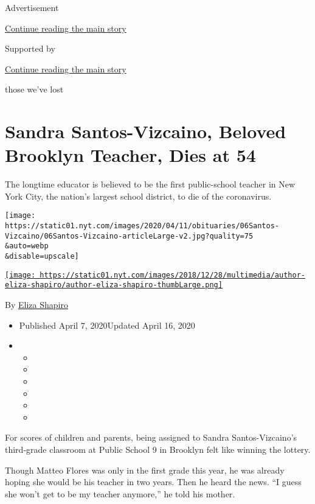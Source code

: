 Advertisement

\protect\hyperlink{after-top}{Continue reading the main story}

Supported by

\protect\hyperlink{after-sponsor}{Continue reading the main story}

those we've lost

\hypertarget{sandra-santos-vizcaino-beloved-brooklyn-teacher-dies-at-54}{%
\section{Sandra Santos-Vizcaino, Beloved Brooklyn Teacher, Dies at
54}\label{sandra-santos-vizcaino-beloved-brooklyn-teacher-dies-at-54}}

The longtime educator is believed to be the first public-school teacher
in New York City, the nation's largest school district, to die of the
coronavirus.

\texttt{[image: https://static01.nyt.com/images/2020/04/11/obituaries/06Santos-Vizcaino/06Santos-Vizcaino-articleLarge-v2.jpg?quality=75\\\&auto=webp\\\&disable=upscale]}

\href{https://www.nytimes.com/by/eliza-shapiro}{\texttt{[image: https://static01.nyt.com/images/2018/12/28/multimedia/author-eliza-shapiro/author-eliza-shapiro-thumbLarge.png]}}

By \href{https://www.nytimes.com/by/eliza-shapiro}{Eliza Shapiro}

\begin{itemize}
\item
  Published April 7, 2020Updated April 16, 2020
\item
  \begin{itemize}
  \item
  \item
  \item
  \item
  \item
  \item
  \end{itemize}
\end{itemize}

For scores of children and parents, being assigned to Sandra
Santos-Vizcaino's third-grade classroom at Public School 9 in Brooklyn
felt like winning the lottery.

Though Matteo Flores was only in the first grade this year, he was
already hoping she would be his teacher in two years. Then he heard the
news. ``I guess she won't get to be my teacher anymore,'' he told his
mother.

